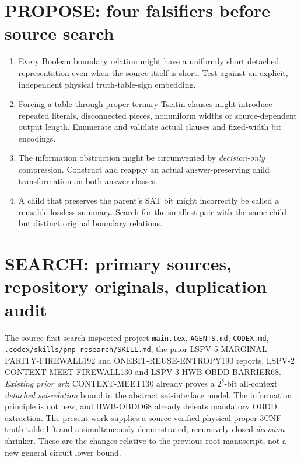 \documentclass[11pt]{article}
\begin{document}
\section{PROPOSE: four falsifiers before source search}
\begin{enumerate}
\item Every Boolean boundary relation might have a uniformly short detached representation even when the source itself is short. Test against an explicit, independent physical truth-table-sign embedding.
\item Forcing a table through proper ternary Tseitin clauses might introduce repeated literals, disconnected pieces, nonuniform widths or source-dependent output length. Enumerate and validate actual clauses and fixed-width bit encodings.
\item The information obstruction might be circumvented by \emph{decision-only} compression. Construct and reapply an actual answer-preserving child transformation on both answer classes.
\item A child that preserves the parent's SAT bit might incorrectly be called a reusable lossless summary. Search for the smallest pair with the same child but distinct original boundary relations.
\end{enumerate}

\section{SEARCH: primary sources, repository originals, duplication audit}
The source-first search inspected project \texttt{main.tex}, \texttt{AGENTS.md}, \texttt{CODEX.md}, \texttt{.codex/skills/pnp-research/SKILL.md}, the prior LSPV-5 MARGINAL-PARITY-FIREWALL192 and ONEBIT-REUSE-ENTROPY190 reports, LSPV-2 CONTEXT-MEET-FIREWALL130 and LSPV-3 HWB-OBDD-BARRIER68. \emph{Existing prior art}: CONTEXT-MEET130 already proves a $2^b$-bit all-context \emph{detached set-relation} bound in the abstract set-interface model. The information principle is not new, and HWB-OBDD68 already defeats mandatory OBDD extraction. The present work supplies a source-verified physical proper-3CNF truth-table lift and a simultaneously demonstrated, recursively closed \emph{decision} shrinker. These are the changes relative to the previous root manuscript, not a new general circuit lower bound.
\end{document}

